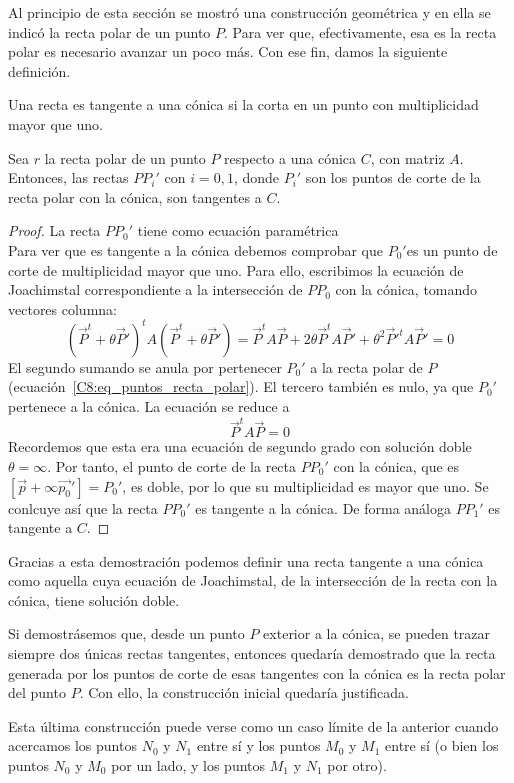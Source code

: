 Al principio de esta sección se mostró una construcción geométrica y en ella se indicó la recta polar de un punto $P$. Para ver que, efectivamente, esa es la recta polar es necesario avanzar un poco más. Con ese fin, damos la siguiente definición.

\begin{defi}
	Una recta es tangente a una cónica si la corta en un punto con multiplicidad mayor que uno.
\end{defi}
\begin{lem}
	Sea $r$ la recta polar de un punto $P$ respecto a una cónica $C$, con matriz $A$. Entonces, las rectas $PP_i'$ con $i=0,1$, donde $P_i'$ son los puntos de corte de la recta polar con la cónica, son tangentes a $C$.
\end{lem}
\begin{proof}
	La recta $PP_0'$ tiene como ecuación paramétrica
	\begin{equation*}
	[\vec{p}+\theta\vec{p_0}']
	\end{equation*}
	Para ver que es tangente a la cónica debemos comprobar que $P_0'$es un punto de corte de multiplicidad mayor que uno. Para ello, escribimos la ecuación de Joachimstal correspondiente a la intersección de $PP_0$ con la cónica, tomando vectores columna:
	\begin{equation}
	(\vec{P}^t+\theta \vec{P}')^tA(\vec{P}^t+\theta \vec{P}')=\vec{P}^tA\vec{P}+2\theta \vec{P}^tA\vec{P}'+\theta^2\vec{P}'^tA\vec{P}'=0
	\end{equation}
	El segundo sumando se anula por pertenecer $P_0'$ a la recta polar de $P$ (ecuación~\eqref{C8:eq_puntos_recta_polar}). El tercero también es nulo, ya que $P_0'$ pertenece a la cónica. La ecuación se reduce a 
	\begin{equation}
	\vec{P}^tA\vec{P}=0
	\end{equation}
	Recordemos que esta era una ecuación de segundo grado con solución doble $\theta=\infty$. Por tanto, el punto de corte de la recta $PP_0'$ con la cónica, que es $[\vec{p}+\infty\vec{p_0}']=P_0'$, es doble, por lo que su multiplicidad es mayor que uno. Se conlcuye así que la recta $PP_0'$ es tangente a la cónica. De forma análoga $PP_1'$ es tangente a $C$.
\end{proof}

\begin{obs}
	 Gracias a esta demostración podemos definir una recta tangente a una cónica como aquella cuya ecuación de Joachimstal, de la intersección de la recta con la cónica, tiene solución doble.
\end{obs}

Si demostrásemos que, desde un punto $P$ exterior a la cónica, se pueden trazar siempre dos únicas rectas tangentes, entonces quedaría demostrado que la recta generada por los puntos de corte de esas tangentes con la cónica es la recta polar del punto $P$. Con ello, la construcción inicial quedaría justificada.
\begin{obs}
	Esta última construcción puede verse como un caso límite de la anterior cuando acercamos los puntos $N_0$ y $N_1$ entre sí y los puntos $M_0$ y $M_1$ entre sí (o bien los puntos $N_0$ y $M_0$ por un lado, y los puntos $M_1$ y $N_1$ por otro).
\end{obs}